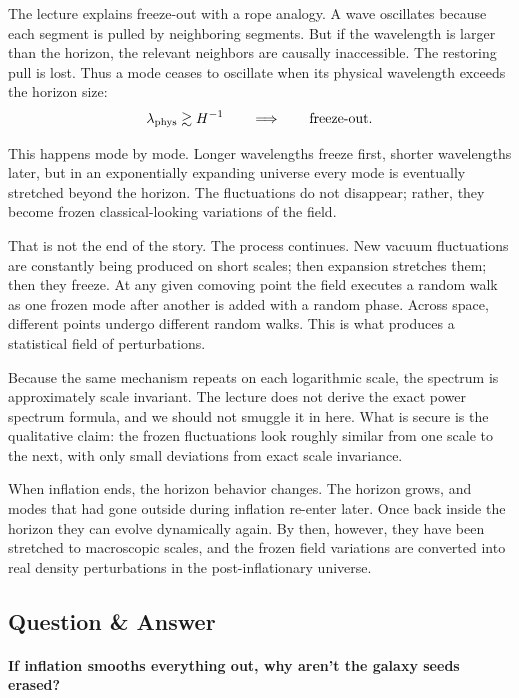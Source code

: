 The lecture explains freeze-out with a rope analogy. A wave oscillates because each segment is pulled by neighboring segments. But if the wavelength is larger than the horizon, the relevant neighbors are causally inaccessible. The restoring pull is lost. Thus a mode ceases to oscillate when its physical wavelength exceeds the horizon size:
\begin{equation}
\lambda_{\rm phys}\gtrsim H^{-1}
\qquad \Longrightarrow \qquad
\text{freeze-out}.
\end{equation}

This happens mode by mode. Longer wavelengths freeze first, shorter wavelengths later, but in an exponentially expanding universe every mode is eventually stretched beyond the horizon. The fluctuations do not disappear; rather, they become frozen classical-looking variations of the field.

That is not the end of the story. The process continues. New vacuum fluctuations are constantly being produced on short scales; then expansion stretches them; then they freeze. At any given comoving point the field executes a random walk as one frozen mode after another is added with a random phase. Across space, different points undergo different random walks. This is what produces a statistical field of perturbations.

Because the same mechanism repeats on each logarithmic scale, the spectrum is approximately scale invariant. The lecture does not derive the exact power spectrum formula, and we should not smuggle it in here. What is secure is the qualitative claim: the frozen fluctuations look roughly similar from one scale to the next, with only small deviations from exact scale invariance.

When inflation ends, the horizon behavior changes. The horizon grows, and modes that had gone outside during inflation re-enter later. Once back inside the horizon they can evolve dynamically again. By then, however, they have been stretched to macroscopic scales, and the frozen field variations are converted into real density perturbations in the post-inflationary universe.

\subsection{Question \& Answer}

\paragraph{If inflation smooths everything out, why aren't the galaxy seeds erased?}

